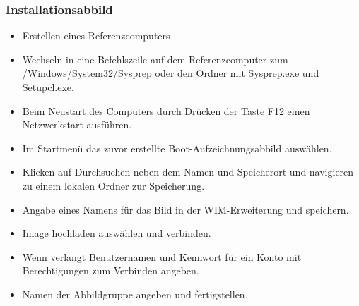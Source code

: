 \documentclass[a4paper,11pt]{article}
\begin{document}
\subsubsection{Installationsabbild}
\begin{itemize}
 \item Erstellen eines Referenzcomputers
 \item Wechseln in eine Befehlszeile auf dem Referenzcomputer zum /Windows/System32/Sysprep oder den Ordner mit Sysprep.exe und Setupcl.exe.
 \item Beim Neustart des Computers durch Drücken der Taste F12 einen Netzwerkstart ausführen.
 \item Im Startmenü das zuvor erstellte Boot-Aufzeichnungsabbild ausw\"ahlen.
 \item Klicken auf Durchsuchen neben dem Namen und Speicherort und navigieren zu einem lokalen Ordner zur Speicherung.
 \item Angabe eines Namens für das Bild in der WIM-Erweiterung und speichern.
 \item Image hochladen ausw\"ahlen und verbinden.
 \item Wenn verlangt Benutzernamen und Kennwort für ein Konto mit Berechtigungen zum Verbinden angeben.
 \item Namen der Abbildgruppe angeben und fertigstellen.
\end{itemize}
\end{document}
